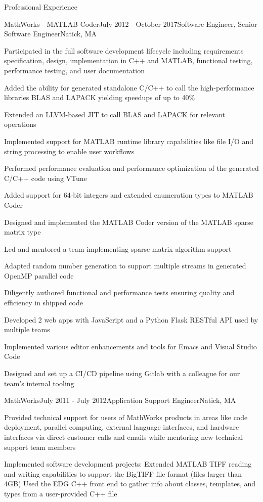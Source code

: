 \documentclass[
	usletter %
	10pt, %
]{resume} %
\begin{document}
\begin{rSection}{Professional Experience}
	\begin{rSubsection}{MathWorks - MATLAB Coder}{July 2012 - October 2017}{Software Engineer, Senior Software Engineer}{Natick, MA}
		\item Participated in the full software development lifecycle including requirements specification, design, implementation in C++ and MATLAB, functional testing, performance testing, and user documentation
		\item Added the ability for generated standalone C/C++ to call the high-performance libraries BLAS and LAPACK yielding speedups of up to 40\%
		\item Extended an LLVM-based JIT to call BLAS and LAPACK for relevant operations
		\item Implemented support for MATLAB runtime library capabilities like file I/O and string processing to enable user workflows
		\item Performed performance evaluation and performance optimization of the generated C/C++ code using VTune
		\item Added support for 64-bit integers and extended enumeration types to MATLAB Coder
		\item Designed and implemented the MATLAB Coder version of the MATLAB sparse matrix type
		\item Led and mentored a team implementing sparse matrix algorithm support
		\item Adapted random number generation to support multiple streams in generated OpenMP parallel code
		\item Diligently authored functional and performance tests ensuring quality and efficiency in shipped code
		\item Developed 2 web apps with JavaScript and a Python Flask RESTful API used by multiple teams
		\item Implemented various editor enhancements and tools for Emacs and Visual Studio Code
		\item Designed and set up a CI/CD pipeline using Gitlab with a colleague for our team's internal tooling
	\end{rSubsection}


	\begin{rSubsection}{MathWorks}{July 2011 - July 2012}{Application Support Engineer}{Natick, MA}
		\item Provided technical support for users of MathWorks products in areas like code deployment, parallel computing, external language interfaces, and hardware interfaces via direct customer calls and emails while mentoring new technical support team members
		\item Implemented software development projects:
		\subitem Extended MATLAB TIFF reading and writing capabilities to support the BigTIFF file format (files larger than 4GB)
		\subitem Used the EDG C++ front end to gather info about classes, templates, and types from a user-provided C++ file
	\end{rSubsection}

\end{rSection}
\end{document}

